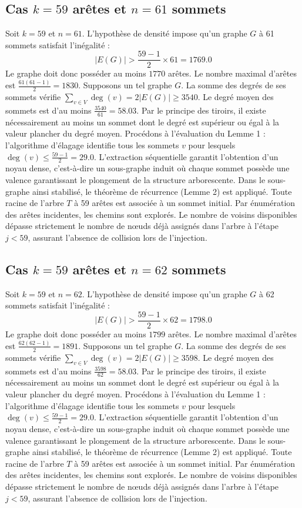 \documentclass[12pt,a4paper]{article}
\begin{document}
\subsection{Cas $k = 59$ arêtes et $n = 61$ sommets}
Soit $k = 59$ et $n = 61$. L'hypothèse de densité impose qu'un graphe $G$ à 61 sommets satisfait l'inégalité :
$$ |E(G)| > \frac{59-1}{2} \times 61 = 1769.0 $$
Le graphe doit donc posséder au moins $1770$ arêtes. Le nombre maximal d'arêtes est $\frac{61(61-1)}{2} = 1830$.
Supposons un tel graphe $G$. La somme des degrés de ses sommets vérifie $\sum_{v \in V} \deg(v) = 2|E(G)| \geq 3540$.
Le degré moyen des sommets est d'au moins $\frac{3540}{61} = 58.03$.
Par le principe des tiroirs, il existe nécessairement au moins un sommet dont le degré est supérieur ou égal à la valeur plancher du degré moyen.
Procédons à l'évaluation du Lemme 1 : l'algorithme d'élagage identifie tous les sommets $v$ pour lesquels $\deg(v) \leq \frac{59-1}{2} = 29.0$.
L'extraction séquentielle garantit l'obtention d'un noyau dense, c'est-à-dire un sous-graphe induit où chaque sommet possède une valence garantissant le plongement de la structure arborescente.
Dans le sous-graphe ainsi stabilisé, le théorème de récurrence (Lemme 2) est appliqué. Toute racine de l'arbre $T$ à 59 arêtes est associée à un sommet initial. Par énumération des arêtes incidentes, les chemins sont explorés. Le nombre de voisins disponibles dépasse strictement le nombre de nœuds déjà assignés dans l'arbre à l'étape $j < 59$, assurant l'absence de collision lors de l'injection.

\subsection{Cas $k = 59$ arêtes et $n = 62$ sommets}
Soit $k = 59$ et $n = 62$. L'hypothèse de densité impose qu'un graphe $G$ à 62 sommets satisfait l'inégalité :
$$ |E(G)| > \frac{59-1}{2} \times 62 = 1798.0 $$
Le graphe doit donc posséder au moins $1799$ arêtes. Le nombre maximal d'arêtes est $\frac{62(62-1)}{2} = 1891$.
Supposons un tel graphe $G$. La somme des degrés de ses sommets vérifie $\sum_{v \in V} \deg(v) = 2|E(G)| \geq 3598$.
Le degré moyen des sommets est d'au moins $\frac{3598}{62} = 58.03$.
Par le principe des tiroirs, il existe nécessairement au moins un sommet dont le degré est supérieur ou égal à la valeur plancher du degré moyen.
Procédons à l'évaluation du Lemme 1 : l'algorithme d'élagage identifie tous les sommets $v$ pour lesquels $\deg(v) \leq \frac{59-1}{2} = 29.0$.
L'extraction séquentielle garantit l'obtention d'un noyau dense, c'est-à-dire un sous-graphe induit où chaque sommet possède une valence garantissant le plongement de la structure arborescente.
Dans le sous-graphe ainsi stabilisé, le théorème de récurrence (Lemme 2) est appliqué. Toute racine de l'arbre $T$ à 59 arêtes est associée à un sommet initial. Par énumération des arêtes incidentes, les chemins sont explorés. Le nombre de voisins disponibles dépasse strictement le nombre de nœuds déjà assignés dans l'arbre à l'étape $j < 59$, assurant l'absence de collision lors de l'injection.
\end{document}
